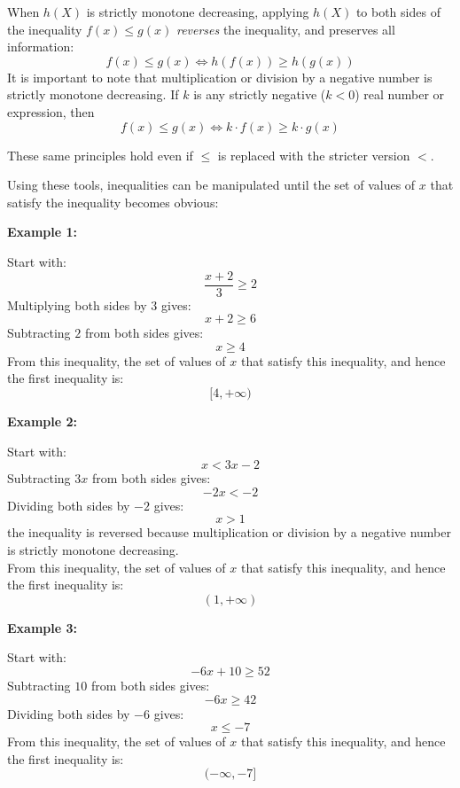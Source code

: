 \documentclass{article}
\begin{document}
\vspace{5mm}

When \(h(X)\) is strictly monotone decreasing, applying \(h(X)\) to both sides of the inequality \(f(x) \leq g(x)\) \emph{reverses} the inequality, and preserves all information:
\[f(x) \leq g(x) \iff h(f(x)) \geq h(g(x))\]
It is important to note that multiplication or division by a negative number is strictly monotone decreasing. If \(k\) is any strictly negative (\(k < 0\)) real number or expression, then
\[f(x) \leq g(x) \iff k \cdot f(x) \geq k \cdot g(x)\]

\vspace{5mm}

These same principles hold even if \(\leq\) is replaced with the stricter version \(<\).

Using these tools, inequalities can be manipulated until the set of values of \(x\) that satisfy the inequality becomes obvious:



\textbf{Example 1:}

Start with:
\[\frac{x + 2}{3} \geq 2\]
Multiplying both sides by \(3\) gives:
\[x + 2 \geq 6\]
Subtracting \(2\) from both sides gives:
\[x \geq 4\]
From this inequality, the set of values of \(x\) that satisfy this inequality, and hence the first inequality is:
\[[4, +\infty)\]

\vspace{5mm}



\textbf{Example 2:}

Start with:
\[x < 3x - 2\]
Subtracting \(3x\) from both sides gives: 
\[-2x < -2\]
Dividing both sides by \(-2\) gives:
\[x > 1\]
the inequality is reversed because multiplication or division by a negative number is strictly monotone decreasing. \\
From this inequality, the set of values of \(x\) that satisfy this inequality, and hence the first inequality is:
\[(1, +\infty)\]

\vspace{5mm}



\textbf{Example 3:}

Start with:
\[-6x + 10 \geq 52\]
Subtracting \(10\) from both sides gives:
\[-6x \geq 42\]
Dividing both sides by \(-6\) gives:
\[x \leq -7\]
From this inequality, the set of values of \(x\) that satisfy this inequality, and hence the first inequality is:
\[(-\infty, -7]\]

\vspace{5mm}
\end{document}
